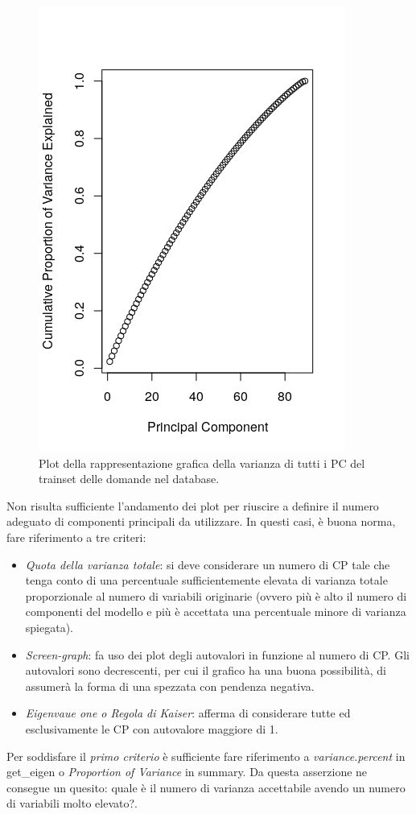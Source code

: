 \begin{figure}[H]
\centering
	\includegraphics[width=0.60\linewidth]{../../PCA/plot/variances2-ALL_rete-db.png}
	\caption{Plot della rappresentazione grafica della varianza di tutti i PC del trainset delle domande nel database.}
\end{figure}
Non risulta sufficiente l'andamento dei plot per riuscire a definire il numero adeguato di componenti principali da utilizzare. In questi casi, \`e buona norma, fare riferimento a tre criteri:
\begin{itemize}
\item \textit{Quota della varianza totale}: si deve considerare un numero di CP tale che tenga conto di una percentuale sufficientemente elevata di varianza totale proporzionale al numero di variabili originarie (ovvero pi\`u \`e alto il numero di componenti del modello e pi\`u \`e accettata una percentuale minore di varianza spiegata).
\item \textit{Screen-graph}: fa uso dei plot degli autovalori in funzione al numero di CP. Gli autovalori sono decrescenti, per cui il grafico ha una buona possibilit\`a, di assumer\`a la forma di una spezzata con pendenza negativa.
\item \textit{Eigenvaue one o Regola di Kaiser}: afferma di considerare tutte ed esclusivamente le CP con autovalore maggiore di 1.
\end{itemize}
\noindent
Per soddisfare il \textit{primo criterio} \`e sufficiente fare riferimento a \textit{variance.percent} in get\_eigen o \textit{Proportion of Variance} in summary. Da questa asserzione ne consegue un quesito: quale \`e il numero di varianza accettabile avendo un numero di variabili molto elevato?.

